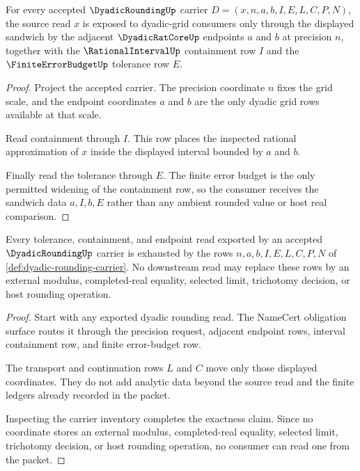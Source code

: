 \begin{theorem}
\label{thm:dyadic-rounding-grid-sandwich}
For every accepted $\DyadicRoundingUp$ carrier $D=(x,n,a,b,I,E,L,C,P,N)$, the source read $x$ is exposed to dyadic-grid consumers only through the displayed sandwich by the adjacent $\DyadicRatCoreUp$ endpoints $a$ and $b$ at precision $n$, together with the $\RationalIntervalUp$ containment row $I$ and the $\FiniteErrorBudgetUp$ tolerance row $E$.
\end{theorem}
\begin{proof}
Project the accepted carrier. The precision coordinate $n$ fixes the grid scale, and the endpoint coordinates $a$ and $b$ are the only dyadic grid rows available at that scale.

Read containment through $I$. This row places the inspected rational approximation of $x$ inside the displayed interval bounded by $a$ and $b$.

Finally read the tolerance through $E$. The finite error budget is the only permitted widening of the containment row, so the consumer receives the sandwich data $a,I,b,E$ rather than any ambient rounded value or host real comparison.
\end{proof}

\begin{theorem}
\label{thm:dyadic-rounding-ledger-exactness}
Every tolerance, containment, and endpoint read exported by an accepted $\DyadicRoundingUp$ carrier is exhausted by the rows $n,a,b,I,E,L,C,P,N$ of \autoref{def:dyadic-rounding-carrier}. No downstream read may replace these rows by an external modulus, completed-real equality, selected limit, trichotomy decision, or host rounding operation.
\end{theorem}
\begin{proof}
Start with any exported dyadic rounding read. The NameCert obligation surface routes it through the precision request, adjacent endpoint rows, interval containment row, and finite error-budget row.

The transport and continuation rows $L$ and $C$ move only those displayed coordinates. They do not add analytic data beyond the source read and the finite ledgers already recorded in the packet.

Inspecting the carrier inventory completes the exactness claim. Since no coordinate stores an external modulus, completed-real equality, selected limit, trichotomy decision, or host rounding operation, no consumer can read one from the packet.
\end{proof}

